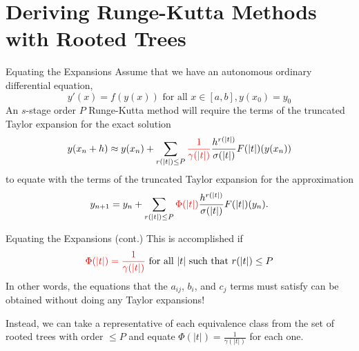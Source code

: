 \documentclass{beamer}
\def \red{\textcolor{red}}
\begin{document}
\section[Deriving the Methods]{Deriving Runge-Kutta Methods with Rooted Trees}

\begin{frame}{Equating the Expansions}
Assume that we have an autonomous ordinary differential equation,
$$y'(x) = f(y(x)) \mbox{ for all } x \in \left[a,b\right], y(x_0) = y_0$$
An $s$-stage order $P$ Runge-Kutta method will require the terms of the truncated Taylor expansion for the exact solution
$$y(x_n + h) \approx y(x_n) + \sum_{r(|t|) \le P}\red{\frac{1}{\gamma(|t|)}}{\frac{h^{r(|t|)}}{\sigma(|t|)}F(|t|)(y(x_n))}$$
to equate with the terms of the truncated Taylor expansion for the approximation
$$y_{n + 1} = y_n + \sum_{r(|t|) \le P}{\red{\Phi(|t|)} \frac{h^{r(|t|)}}{\sigma(|t|)}F(|t|)(y_n)}.$$

\end{frame}

\begin{frame}{Equating the Expansions (cont.)}
This is accomplished if
$$\red{\Phi(|t|) = \frac{1}{\gamma(|t|)}} \mbox{ for all } |t| \mbox{ such that } r(|t|) \le P$$
In other words, the equations that the $a_{ij}$, $b_i$, and $c_j$ terms must satisfy can be obtained 
without doing any Taylor expansions! \newline

Instead, we can take a representative of each equivalence class from the set of rooted trees with order $\le P$
and equate $\Phi(|t|) = \frac{1}{\gamma(|t|)}$ for each one.
\end{frame}
\end{document}
